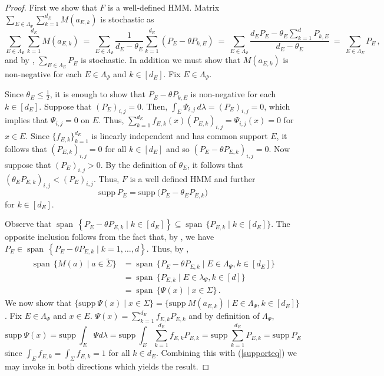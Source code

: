 \documentclass[a4paper,UKenglish,cleveref, autoref,mathscr]{lipics-v2019}
\newcommand{\1}{\mathbbm{1}}
\newcommand{\supp}{\mathrm{supp}}
\DeclareMathOperator{\Span}{span\,}
\begin{document}
\begin{proof}
First we show that $F$ is a well-defined HMM. Matrix $\sum_{E \in \Lambda_\Psi}\sum_{k=1}^{d_E} M(a_{E,k})$ is stochastic as
\begin{equation}\label{sumofps}
\sum_{E \in \Lambda_\Psi}\sum_{k=1}^{d_E} M(a_{E,k}) \ = \ \sum_{E \in \Lambda_\Psi}\frac{1}{d_E - \theta_E}\sum_{k=1}^{d_E}(P_E - \theta P_{k,E}) \ = \ \sum_{E \in \Lambda_\Psi} \frac{d_E P_E - \theta_E \sum_{k=1}^d P_{k,E}}{d_E - \theta_E} \ = \ \sum_{E \in \Lambda_E} P_E\,,
\end{equation}
and by , $\sum_{E \in \Lambda_E} P_E$ is stochastic. In addition we must show that $M(a_{E,k})$ is non-negative for each $E \in \Lambda_\Psi$ and $k \in [d_E]$.
Fix $E \in \Lambda_\Psi$. 


Since $\theta_E \le \frac12$, it is enough to show that $P_E - \theta P_{k,E}$ is non-negative for each $k \in [d_E]$. Suppose that $(P_E)_{i,j} = 0$.
Then, $\int_E \Psi_{i,j}\, d\lambda = (P_E)_{i,j} = 0$, which implies that $\Psi_{i,j} = 0$ on $E$.
Thus, $\sum_{k = 1}^{d_E} f_{E,k}(x) (P_{E,k})_{i,j} = \Psi_{i,j}(x) = 0$ for $x \in E$.
Since $\{f_{E,k}\}_{k=1}^{d_E}$ is linearly independent and has common support $E$, it follows that $(P_{E,k})_{i,j} = 0$ for all $k \in [d_E]$ and so $(P_E - \theta P_{E,k})_{i,j} = 0$.
Now suppose that $(P_E)_{i,j} > 0$. By the definition of $\theta_E$, it follows that $(\theta_E P_{E,k})_{i,j} < (P_E)_{i,j}$. Thus, $F$ is a well defined HMM and further 
\begin{equation}\label{supporteq}
\supp~ P_E = \supp~ \big(P_E - \theta_E P_{E,k}\big)
\end{equation}
for $k \in [d_E]$.

Observe that $\Span \left\{ P_E - \theta P_{E,k} \mid k \in [d_E] \right\} \subseteq \Span \{P_{E,k} \mid k \in [d_E]\}$.
The opposite inclusion follows from the fact that, by , we have $P_E \in \Span \left\{ P_E - \theta P_{E,k} \mid k = 1, \dots, d \right\}$.
Thus, by ,
\begin{align*}
\Span\{M(a) \mid a \in \tilde{\Sigma}\} & = \Span\{P_{E} - \theta P_{E,k} \mid E \in \Lambda_\Psi, k \in [d_E]\}\\
& = \Span\{P_{E,k}  \mid E \in \lambda_\Psi, k \in [d]\} \\
& = \Span\{\Psi(x) \mid x \in \Sigma\}\,.	
\end{align*}
We now show that $\{\supp~ \Psi(x) \mid x \in \Sigma \} = \{\supp~ M(a_{E,k}) \mid E \in \Lambda_{\Psi}, k \in [d_E] \}$.
Fix $E \in \Lambda_\Psi$ and $x \in E$. $\Psi(x) = \sum_{k = 1}^{d_E} f_{E,k} P_{E,k}$ and by definition of $\Lambda_\Psi$, \[\supp~ \Psi(x) = \supp~ \int_{E} \Psi d\lambda = \supp~ \int_{E} \sum_{k = 1}^{d_E} f_{E,k} P_{E,k} = \supp~ \sum_{k = 1}^{d_E} P_{E,k} = \supp~ P_E\]
since $\int_E f_{E,k} = \int_\Sigma f_{E,k} = 1$ for all $k \in d_E$. Combining this with (\ref{supporteq}) we may invoke  in both directions which yields the result.
\end{proof}
\end{document}
